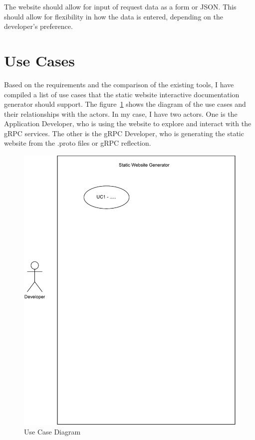 The website should allow for input of request data as a form or JSON\@.
This should allow for flexibility in how the data is entered, depending on the developer's preference.


\section{Use Cases}
Based on the requirements and the comparison of the existing tools, I have compiled a list of use cases that the static website interactive documentation generator should support.
The figure~\ref{fig:use-case-diagram} shows the diagram of the use cases and their relationships with the actors.
In my case, I have two actors.
One is the Application Developer, who is using the website to explore and interact with the gRPC services.
The other is the gRPC Developer, who is generating the static website from the .proto files or gRPC reflection.

\begin{figure}
    \centering
    \captionsetup{justification=centering}
    \includegraphics[width=1.0\textwidth]{images/use-case-diagram}
    \caption{Use Case Diagram}
    \label{fig:use-case-diagram}
\end{figure}


